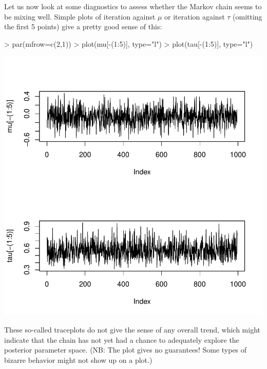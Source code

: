\documentclass{article}
\begin{document}
Let us now look at some diagnostics to assess whether the Markov chain seems to be 
mixing well.  Simple plots of iteration against $\mu$ or iteration against $\tau$ (omitting the
first 5 points) give a pretty
good sense of this:
\begin{Schunk}
\begin{Sinput}
> par(mfrow=c(2,1))
> plot(mu[-(1:5)], type="l")
> plot(tau[-(1:5)], type="l")
\end{Sinput}
\end{Schunk}
\includegraphics{MCMCexample-005}

These so-called traceplots do not give the sense of any overall trend, which might
indicate that the chain has not yet had a chance to adequately explore the posterior
parameter space.  (NB:  The plot gives no guarantees!  Some types of bizarre behavior
might not show up on a plot.)
\end{document}
